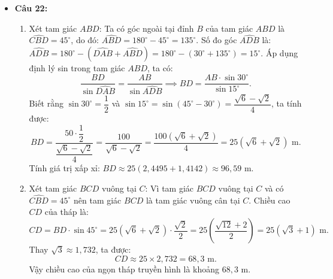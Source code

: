 \documentclass[12pt,a4paper]{article}
\begin{document}
\begin{itemize}[leftmargin=0.6cm, itemsep=3pt]
    \item \textbf{Câu 22:}
    \begin{enumerate}[label=\alph*)]
        \item Xét tam giác $ABD$:
        Ta có góc ngoài tại đỉnh $B$ của tam giác $ABD$ là $\widehat{CBD} = 45^\circ$, do đó:
        $\widehat{ABD} = 180^\circ - 45^\circ = 135^\circ$.
        Số đo góc $\widehat{ADB}$ là:
        $\widehat{ADB} = 180^\circ - (\widehat{DAB} + \widehat{ABD}) = 180^\circ - (30^\circ + 135^\circ) = 15^\circ$.
        Áp dụng định lý sin trong tam giác $ABD$, ta có:
        \[
        \dfrac{BD}{\sin \widehat{DAB}} = \dfrac{AB}{\sin \widehat{ADB}} \implies BD = \dfrac{AB \cdot \sin 30^\circ}{\sin 15^\circ}.
        \]
        Biết rằng $\sin 30^\circ = \dfrac{1}{2}$ và $\sin 15^\circ = \sin(45^\circ - 30^\circ) = \dfrac{\sqrt{6} - \sqrt{2}}{4}$, ta tính được:
        \[
        BD = \dfrac{50 \cdot \dfrac{1}{2}}{\dfrac{\sqrt{6} - \sqrt{2}}{4}} = \dfrac{100}{\sqrt{6} - \sqrt{2}} = \dfrac{100(\sqrt{6} + \sqrt{2})}{4} = 25(\sqrt{6} + \sqrt{2})\text{ m}.
        \]
        Tính giá trị xấp xỉ: $BD \approx 25(2{,}4495 + 1{,}4142) \approx 96{,}59\text{ m}$.
        \item Xét tam giác $BCD$ vuông tại $C$:
        Vì tam giác $BCD$ vuông tại $C$ và có $\widehat{CBD} = 45^\circ$ nên tam giác $BCD$ là tam giác vuông cân tại $C$. Chiều cao $CD$ của tháp là:
        \[
        CD = BD \cdot \sin 45^\circ = 25(\sqrt{6} + \sqrt{2}) \cdot \dfrac{\sqrt{2}}{2} = 25\left(\dfrac{\sqrt{12} + 2}{2}\right) = 25(\sqrt{3} + 1)\text{ m}.
        \]
        Thay $\sqrt{3} \approx 1{,}732$, ta được:
        \[
        CD \approx 25 \times 2{,}732 = 68{,}3\text{ m}.
        \]
        Vậy chiều cao của ngọn tháp truyền hình là khoảng $68{,}3\text{ m}$.
    \end{enumerate}
\end{itemize}
\end{document}
